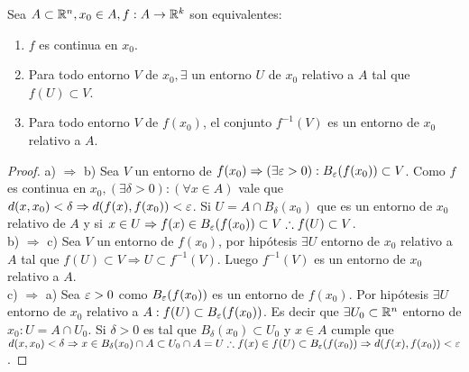 \begin{prop}
  Sea \(A \subset \mathbb{R}^n, x_0 \in A, f: A \to \mathbb{R}^k\) son equivalentes:
  \begin{enumerate}
    \item \(f\) es continua en \(x_0\).
    \item Para todo entorno \(V\) de \(x_0, \exists \) un entorno \(U\) de \(x_0\) relativo a \(A\) tal que \(f(U) \subset V\).
    \item Para todo entorno \(V\) de \(f(x_0)\), el conjunto \(f^{-1}(V)\) es un entorno de \(x_0\) relativo a \(A\).
  \end{enumerate}

  \begin{proof}
    a) \(\Rightarrow \) b) Sea \(V\) un entorno de \(f(x_0) \Rightarrow (\exists \varepsilon > 0) : B_{\varepsilon}(f(x_0)) \subset V\). Como \(f\) es continua en \(x_0, (\exists \delta > 0) : (\forall x \in A)\) vale que \(d(x, x_0) < \delta \Rightarrow d(f(x), f(x_0)) < \varepsilon \). Si \(U = A \cap B_{\delta}(x_0)\) que es un entorno de \(x_0\) relativo de \(A\) y si \(x \in U \Rightarrow f(x) \in B_{\varepsilon}(f(x_0)) \subset V \therefore f(U) \subset V\). \\
    b) \(\Rightarrow \) c) Sea \(V\) un entorno de \(f(x_0)\), por hipótesis \(\exists U\) entorno de \(x_0\) relativo a \(A\) tal que \(f(U) \subset V \Rightarrow U \subset f^{-1}(V)\). Luego \(f^{-1}(V)\) es un entorno de \(x_0\) relativo a \(A\). \\
    c) \(\Rightarrow \) a) Sea \(\varepsilon > 0\) como \(B_{\varepsilon}(f(x_0))\) es un entorno de \(f(x_0)\). Por hipótesis \(\exists U\) entorno de \(x_0\) relativo a \(A : f(U) \subset B_{\varepsilon}(f(x_0))\). Es decir que \(\exists U_0 \subset \mathbb{R}^n\) entorno de \(x_0 : U = A \cap U_0\). Si \(\delta > 0\) es tal que \(B_{\delta}(x_0) \subset U_0\) y \(x \in A\) cumple que \(d(x, x_0) < \delta \Rightarrow x \in B_{\delta}(x_0) \cap A \subset U_0 \cap A = U \therefore f(x) \in f(U) \subset B_{\varepsilon}(f(x_0))  \Rightarrow d(f(x), f(x_0)) < \varepsilon \).
  \end{proof}
\end{prop}


